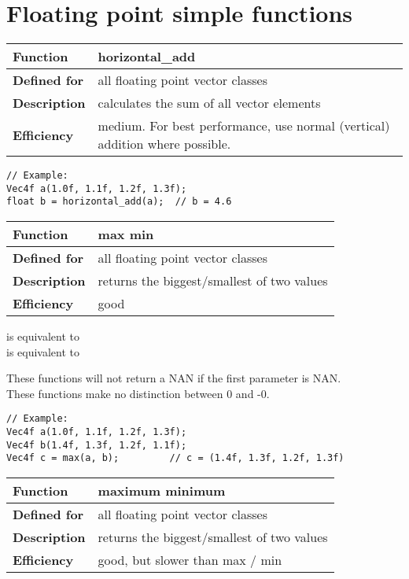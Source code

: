 \documentclass[vcl_manual.tex]{subfiles}
\begin{document}
\section{Floating point simple functions}

\begin{tabular}{|p{25mm}|p{100mm}|}
\hline
\bfseries Function & horizontal\_add \\ \hline
\bfseries Defined for & all floating point vector classes \\ \hline
\bfseries Description & calculates the sum of all vector elements \\ \hline
\bfseries Efficiency & medium. For best performance, use normal (vertical) addition where possible. \\ \hline
\end{tabular}
\begin{lstlisting}[frame=none]
// Example:
Vec4f a(1.0f, 1.1f, 1.2f, 1.3f);
float b = horizontal_add(a);  // b = 4.6
\end{lstlisting}


\begin{tabular}{|p{25mm}|p{100mm}|}
\hline
\bfseries Function & max \newline min \\ \hline
\bfseries Defined for & all floating point vector classes \\ \hline
\bfseries Description & returns the biggest/smallest of two values \\ \hline
\bfseries Efficiency & good \\ \hline
\end{tabular}

 is equivalent to \\
 is equivalent to \\

These functions will not return a NAN if the first parameter is NAN.\\
These functions make no distinction between 0 and -0.
\begin{lstlisting}[frame=none]
// Example:
Vec4f a(1.0f, 1.1f, 1.2f, 1.3f);
Vec4f b(1.4f, 1.3f, 1.2f, 1.1f);
Vec4f c = max(a, b);         // c = (1.4f, 1.3f, 1.2f, 1.3f)
\end{lstlisting}

\begin{tabular}{|p{25mm}|p{100mm}|}
\hline
\bfseries Function & maximum \newline minimum \\ \hline
\bfseries Defined for & all floating point vector classes \\ \hline
\bfseries Description & returns the biggest/smallest of two values \\ \hline
\bfseries Efficiency & good, but slower than max / min \\ \hline
\end{tabular}
\end{document}
